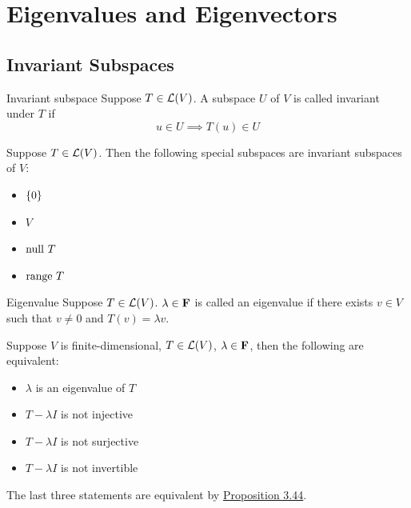\documentclass[12pt,a4paper]{article}
\begin{document}
    \section{Eigenvalues and Eigenvectors}
    \subsection{Invariant Subspaces}
    \begin{defi}{Invariant subspace}
        Suppose $T\in\mathcal{L}(V)$. A subspace $U$ of $V$ is called invariant under $T$ if
        $$u\in U\implies T(u)\in U$$
    \end{defi}
    \begin{eg}
        Suppose $T\in\mathcal{L}(V)$. Then the following special subspaces are invariant subspaces of $V$:
        \begin{itemize}
            \item $\left\{0\right\}$
            \item $V$
            \item $\operatorname{null\,} T$
            \item $\operatorname{range\,} T$
        \end{itemize}
    \end{eg}
    \hfill

    \begin{defi}{Eigenvalue}
        Suppose $T\in\mathcal{L}(V)$. $\lambda\in\mathbf{F}$ is called an eigenvalue if there exists $v\in V$ such that $v\neq0$ and $T(v)=\lambda v$.
    \end{defi}
    \hfill

    \begin{prop}\label{5.4}
        Suppose $V$ is finite-dimensional, $T\in\mathcal{L}(V)$, $\lambda\in\mathbf{F}$, then the following are equivalent:
        \begin{itemize}
            \item $\lambda$ is an eigenvalue of $T$
            \item $T-\lambda I$ is not injective
            \item $T-\lambda I$ is not surjective
            \item $T-\lambda I$ is not invertible
        \end{itemize}
    \end{prop}
    \begin{remark}
        The last three statements are equivalent by \hyperref[3.44]{Proposition 3.44}.
    \end{remark}
    \hfill
\end{document}
